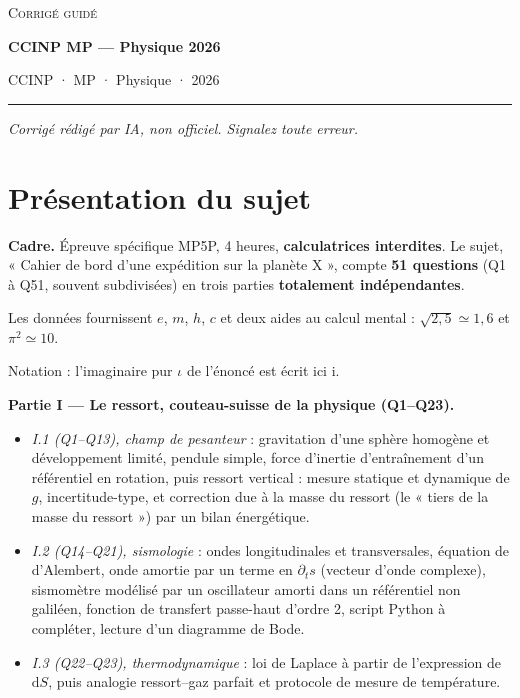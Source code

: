 \documentclass[11pt,a4paper]{article}
\providecommand{\tightlist}{\setlength{\itemsep}{0pt}\setlength{\parskip}{0pt}}
\begin{document}
\thispagestyle{plain}
\begin{center}
  {\small\scshape Corrigé guidé}\par\smallskip
  {\LARGE\bfseries CCINP MP — Physique 2026\par}\medskip
  {\large CCINP · MP · Physique · 2026\par}
\end{center}
\vspace{2pt}\hrule\vspace{8pt}

\emph{Corrigé rédigé par IA, non officiel. Signalez toute erreur.}

\hypertarget{pruxe9sentation-du-sujet}{%
\section{Présentation du sujet}\label{pruxe9sentation-du-sujet}}

\textbf{Cadre.} Épreuve spécifique MP5P, 4 heures, \textbf{calculatrices interdites}. Le sujet, « Cahier de bord d'une expédition sur la planète X », compte \textbf{51 questions} (Q1 à Q51, souvent subdivisées) en trois parties \textbf{totalement indépendantes}.

Les données fournissent \(e\), \(m\), \(h\), \(c\) et deux aides au calcul mental : \(\sqrt{2{,}5}\simeq1{,}6\) et \(\pi^2\simeq10\).

Notation : l'imaginaire pur \(\iota\) de l'énoncé est écrit ici \(\mathrm{i}\).

\textbf{Partie I --- Le ressort, couteau-suisse de la physique (Q1--Q23).}

\begin{itemize}
\tightlist
\item
  \emph{I.1 (Q1--Q13), champ de pesanteur} : gravitation d'une sphère homogène et développement limité, pendule simple, force d'inertie d'entraînement d'un référentiel en rotation, puis ressort vertical : mesure statique et dynamique de \(g\), incertitude-type, et correction due à la masse du ressort (le « tiers de la masse du ressort ») par un bilan énergétique.
\item
  \emph{I.2 (Q14--Q21), sismologie} : ondes longitudinales et transversales, équation de d'Alembert, onde amortie par un terme en \(\partial_t s\) (vecteur d'onde complexe), sismomètre modélisé par un oscillateur amorti dans un référentiel non galiléen, fonction de transfert passe-haut d'ordre 2, script Python à compléter, lecture d'un diagramme de Bode.
\item
  \emph{I.3 (Q22--Q23), thermodynamique} : loi de Laplace à partir de l'expression de \(\mathrm{d}S\), puis analogie ressort--gaz parfait et protocole de mesure de température.
\end{itemize}
\end{document}
